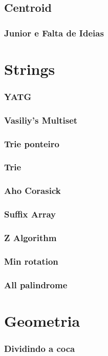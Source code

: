 \documentclass[a4paper,12pt]{article}
\newcommand\includess[4]{
   \subsubsection{#2}
   
}
\begin{document}
\begin{multicols}{2}
\subsection{Centroid}
\includess{c++}{Junior e Falta de Ideias}{graph}{centroid_decomp.cpp}

\section{Strings}
\includess{c++}{YATG}{strings}{YATG.cpp}
\includess{c++}{Vasiliy's Multiset}{strings}{multiset.cpp}
\includess{c++}{Trie ponteiro}{strings}{trie_ponteiro.cpp}
\includess{c++}{Trie}{strings}{trieXor.cpp}
\includess{c++}{Aho Corasick}{strings}{aho-corasick.cpp}
\includess{c++}{Suffix Array}{strings}{suffix_array.cpp}
\includess{c++}{Z Algorithm}{strings}{z_algo.cpp}
\includess{c++}{Min rotation}{strings}{min_rot.cpp}
\includess{c++}{All palindrome}{strings}{all_palindrome.cpp}

\section{Geometria}
\includess{c++}{Dividindo a coca}{geometria}{coca.cpp}


\end{multicols}
\end{document}
